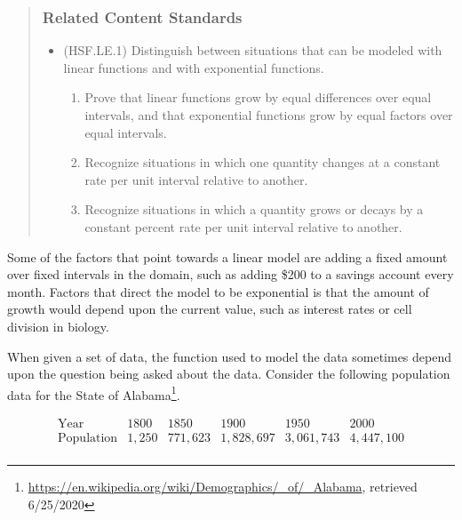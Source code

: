 \documentclass[
]{book}
\providecommand{\tightlist}{%
  \setlength{\itemsep}{0pt}\setlength{\parskip}{0pt}}
\theoremstyle{definition}
\theoremstyle{definition}
\theoremstyle{definition}
\theoremstyle{remark}
\begin{document}
\begin{quote}
\hypertarget{related-content-standards-46}{%
\subsubsection*{Related Content Standards}\label{related-content-standards-46}}

\begin{itemize}
\tightlist
\item
  (HSF.LE.1) Distinguish between situations that can be modeled with linear functions and with exponential functions.

  \begin{enumerate}
  \def\labelenumi{\alph{enumi}.}
  \tightlist
  \item
    Prove that linear functions grow by equal differences over equal intervals, and that exponential functions grow by equal factors over equal intervals.
  \item
    Recognize situations in which one quantity changes at a constant rate per unit interval relative to another.
  \item
    Recognize situations in which a quantity grows or decays by a constant percent rate per unit interval relative to another.
  \end{enumerate}
\end{itemize}
\end{quote}

Some of the factors that point towards a linear model are adding a fixed amount over fixed intervals in the domain, such as adding \$200 to a savings account every month. Factors that direct the model to be exponential is that the amount of growth would depend upon the current value, such as interest rates or cell division in biology.

When given a set of data, the function used to model the data sometimes depend upon the question being asked about the data. Consider the following population data for the State of Alabama\footnote{\url{https://en.wikipedia.org/wiki/Demographics/_of/_Alabama}, retrieved 6/25/2020}.

\[\begin{array}{c|ccccc}
 \mbox{Year} & 1800 & 1850 & 1900 & 1950 & 2000 \\ \hline
 \mbox{Population} & 1,250  & 771,623  & 1,828,697 & 3,061,743 & 4,447,100 \\
\end{array}\]
\end{document}
